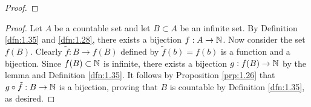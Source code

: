 \documentclass[../main.tex]{subfiles}
\begin{document}
\begin{exercise}
\begin{lemma*}
\begin{proof}
        \end{proof}
    \end{lemma*}
    \begin{proof}
        Let $A$ be a countable set and let $B\subset A$ be an infinite set. By Definition \ref{dfn:1.35} and \ref{dfn:1.28}, there exists a bijection $f:A\to\mathbb{N}$. Now consider the set $f(B)$. Clearly $\tilde{f}:B\to f(B)$ defined by $\tilde{f}(b)=f(b)$ is a function and a bijection. Since $f(B)\subset\mathbb{N}$ is infinite, there exists a bijection $g:f(B)\to\mathbb{N}$ by the lemma and Definition \ref{dfn:1.35}. It follows by Proposition \ref{prp:1.26} that $g\circ\tilde{f}:B\to\mathbb{N}$ is a bijection, proving that $B$ is countable by Definition \ref{dfn:1.35}, as desired.
    \end{proof}
\end{exercise}
\end{document}
